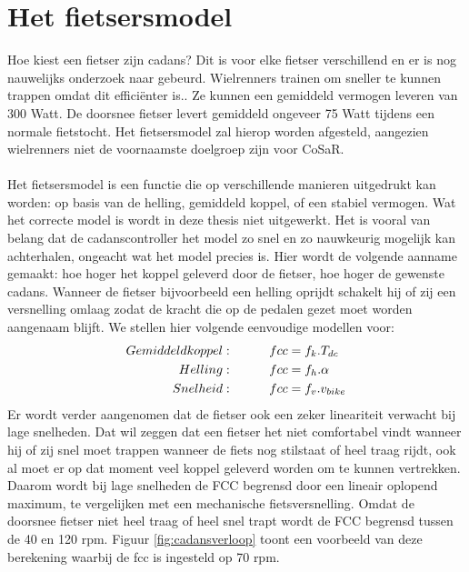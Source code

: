 \section{Het fietsersmodel}
Hoe kiest een fietser zijn cadans? Dit is voor elke fietser verschillend en er is nog nauwelijks onderzoek naar gebeurd. Wielrenners trainen om sneller te kunnen trappen omdat dit efficiënter is.. Ze kunnen een gemiddeld vermogen leveren van 300 Watt. De doorsnee fietser levert gemiddeld ongeveer 75 Watt tijdens een normale fietstocht. Het fietsersmodel zal hierop worden afgesteld, aangezien wielrenners niet de voornaamste doelgroep zijn voor CoSaR.
\\\\
Het fietsersmodel is een functie die op verschillende manieren uitgedrukt kan worden: op basis van de helling, gemiddeld koppel, of een stabiel vermogen. Wat het correcte model is wordt in deze thesis niet uitgewerkt. Het is vooral van belang dat de cadanscontroller het model zo snel en zo nauwkeurig mogelijk kan achterhalen, ongeacht wat het model precies is. Hier wordt de volgende aanname gemaakt: hoe hoger het koppel geleverd door de fietser, hoe hoger de gewenste cadans. Wanneer de fietser bijvoorbeeld een helling oprijdt schakelt hij of zij een versnelling omlaag zodat de kracht die op de pedalen gezet moet worden aangenaam blijft. We stellen hier volgende eenvoudige modellen voor:
\begin{align*}
Gemiddeld koppel:\hspace*{1cm} fcc &= f_k . T_{dc}\\
Helling:\hspace*{1cm} fcc &= f_h . \alpha\\
Snelheid:\hspace*{1cm} fcc &= f_v . v_{bike}
\end{align*}
Er wordt verder aangenomen dat de fietser ook een zeker lineariteit verwacht bij lage snelheden. Dat wil zeggen dat een fietser het niet comfortabel vindt wanneer hij of zij snel moet trappen wanneer de fiets nog stilstaat of heel traag rijdt, ook al moet er op dat moment veel koppel geleverd worden om te kunnen vertrekken. Daarom wordt bij lage snelheden de FCC begrensd door een lineair oplopend maximum, te vergelijken met een mechanische fietsversnelling. Omdat de doorsnee fietser niet heel traag of heel snel trapt wordt de FCC begrensd tussen de 40 en 120 rpm. Figuur \ref{fig:cadansverloop} toont een voorbeeld van deze berekening waarbij de fcc is ingesteld op 70 rpm.
